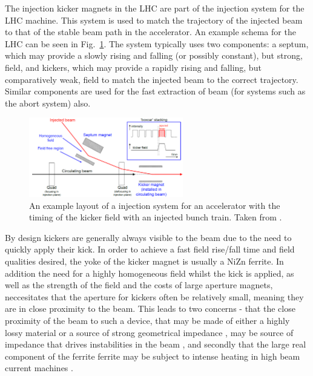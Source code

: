 The injection kicker magnets in the LHC are part of the injection system for the LHC machine. This system is used to match the trajectory of the injected beam to that of the stable beam path in the accelerator. An example schema for the LHC can be seen in Fig.~\ref{fig:injection-system-schema}. The system typically uses two components: a septum, which may provide a slowly rising and falling (or possibly constant), but strong, field, and kickers, which may provide a rapidly rising and falling, but comparatively weak, field to match the injected beam to the correct trajectory. Similar components are used for the fast extraction of beam (for systems such as the abort system) also.

\begin{figure}
\begin{center}
\includegraphics[width=0.6\textwidth]{LHC_MKI/figures/injection-system.png}
\end{center}
\caption{An example layout of a injection system for an accelerator with the timing of the kicker field with an injected bunch train. Taken from \cite{Barnes:injSys}.}
\label{fig:injection-system-schema}
\end{figure}

By design kickers are generally always visible to the beam due to the need to quickly apply their kick. In order to achieve a fast field rise/fall time and field qualities desired, the yoke of the kicker magnet is usually a NiZn ferrite. In addition the need for a highly homogeneous field whilst the kick is applied, as well as the strength of the field and the costs of large aperture magnets, neccesitates that the aperture for kickers often be relatively small, meaning they are in close proximity to the beam. This leads to two concerns - that the close proximity of the beam to such a device, that may be made of either a highly lossy material \cite{Day:wireMeasFerr, Barnes:wireMeasKick, Barnes:spsKickerHeating} or a source of strong geometrical impedance \cite{Belver-Aguilar:clicStripline}, may be source of impedance that drives instabilities in the beam \cite{Salvant:spsImpModel}, and secondly that the large real component of the ferrite ferrite may be subject to intense heating in high beam current machines \cite{Barnes:spsKickerHeating}. 

